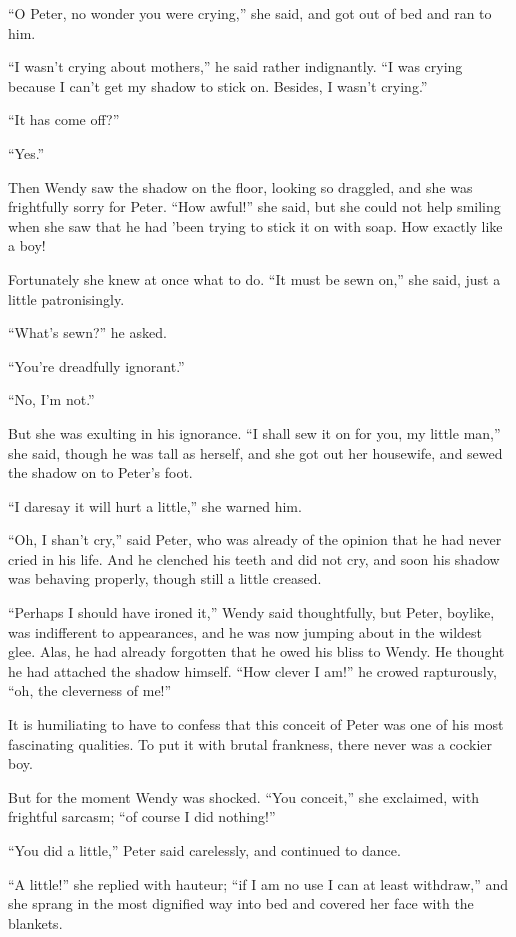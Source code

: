 ``O Peter, no wonder you were crying,'' she said, and got out of bed and ran to
him.

``I wasn't crying about mothers,'' he said rather indignantly.
``I was crying because I can't get my shadow to stick on.
Besides, I wasn't crying.''

``It has come off?''

``Yes.''

Then Wendy saw the shadow on the floor, looking so draggled, and she was
frightfully sorry for Peter.
``How awful!'' she said, but she could not help smiling when she saw that he had
'been trying to stick it on with soap.
How exactly like a boy!

Fortunately she knew at once what to do.
``It must be sewn on,'' she said, just a little patronisingly.

``What's sewn?'' he asked.

``You're dreadfully ignorant.''

``No, I'm not.''

But she was exulting in his ignorance.
``I shall sew it on for you, my little man,'' she said, though he was tall as
herself, and she got out her housewife, and sewed the shadow on to Peter's foot.

``I daresay it will hurt a little,'' she warned him.

``Oh, I shan't cry,'' said Peter, who was already of the opinion that he had
never cried in his life.
And he clenched his teeth and did not cry, and soon his shadow was behaving
properly, though still a little creased.

``Perhaps I should have ironed it,'' Wendy said thoughtfully, but Peter,
boylike, was indifferent to appearances, and he was now jumping about in the
wildest glee.
Alas, he had already forgotten that he owed his bliss to Wendy.
He thought he had attached the shadow himself.
``How clever I am!'' he crowed rapturously, ``oh, the cleverness of me!''

It is humiliating to have to confess that this conceit of Peter was one of his
most fascinating qualities.
To put it with brutal frankness, there never was a cockier boy.

But for the moment Wendy was shocked.
``You conceit,'' she exclaimed, with frightful sarcasm; ``of course I did
nothing!''

``You did a little,'' Peter said carelessly, and continued to dance.

``A little!'' she replied with hauteur; ``if I am no use I can at least
withdraw,'' and she sprang in the most dignified way into bed and covered her
face with the blankets.

